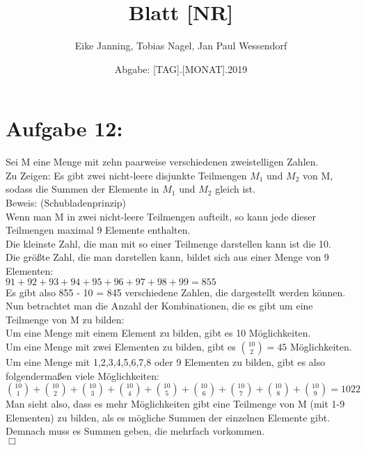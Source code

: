 \documentclass[paper = a4, ngerman]{scrartcl}
\title{Blatt [NR]}
\author{Eike Janning, Tobias Nagel, Jan Paul Wessendorf}
\date{Abgabe: [TAG].[MONAT].2019}
\begin{document}
\maketitle
\hrulefill
\section*{Aufgabe 12:}
Sei M eine Menge mit zehn paarweise verschiedenen zweistelligen Zahlen.\\

Zu Zeigen: Es gibt zwei nicht-leere disjunkte Teilmengen $M_1$ und $M_2$ von M, sodass die Summen der Elemente in $M_1$ und $M_2$ gleich ist.\\

Beweis: (Schubladenprinzip)\\

Wenn man M in zwei nicht-leere Teilmengen aufteilt, so kann jede dieser Teilmengen maximal 9 Elemente enthalten.\\

Die kleinste Zahl, die man mit so einer Teilmenge darstellen kann ist die 10.\\

Die größte Zahl, die man darstellen kann, bildet sich aus einer Menge von 9 Elementen:\\
$91+92+93+94+95+96+97+98+99 = 855$\\

Es gibt also 855 - 10 = 845 verschiedene Zahlen, die dargestellt werden können.\\

Nun betrachtet man die Anzahl der Kombinationen, die es gibt um eine Teilmenge von M zu bilden:\\

Um eine Menge mit einem Element zu bilden, gibt es 10 Möglichkeiten.\\
Um eine Menge mit  zwei Elementen zu bilden, gibt es $\binom{10}{2} = 45$ Möglichkeiten.\\

Um eine Menge mit 1,2,3,4,5,6,7,8 oder 9 Elementen zu bilden, gibt es also folgendermaßen viele Möglichkeiten:\\

$\binom{10}{1} + \binom{10}{2} +\binom{10}{3} +\binom{10}{4} + \binom{10}{5} +\binom{10}{6} +\binom{10}{7} + \binom{10}{8} +\binom{10}{9} = 1022$\\

Man sieht also, dass es mehr Möglichkeiten gibt eine Teilmenge von M (mit 1-9 Elementen) zu bilden, als es mögliche Summen der einzelnen Elemente gibt. Demnach muss es Summen geben, die mehrfach vorkommen.\\
\hfil$\Box$
\end{document}
